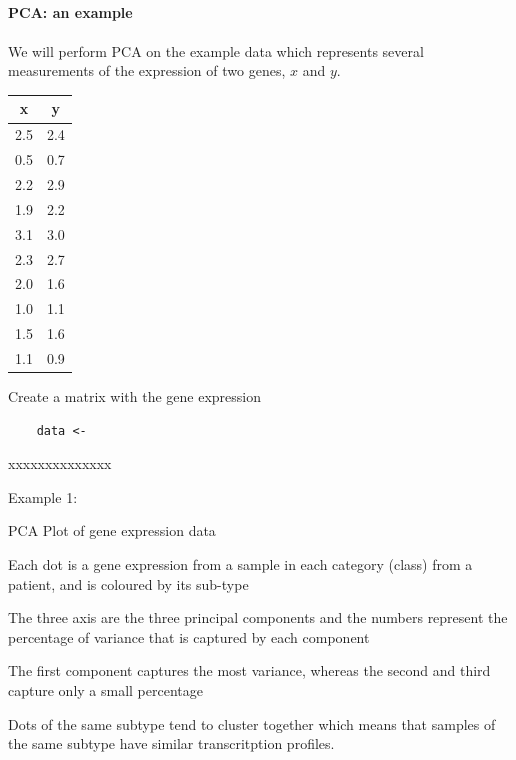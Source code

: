 \documentclass[11pt, oneside]{article}   	%
\begin{document}
\paragraph{PCA: an example}
\paragraph{}

We will perform PCA on the example data which represents several measurements of the expression of two genes, $x$ and $y$.

\begin{center}
\begin{tabular}{c|c}
   x & y \\
   \hline
   2.5 & 2.4\\
   0.5 & 0.7\\
   2.2 & 2.9\\
   1.9 & 2.2\\
   3.1 & 3.0\\
   2.3 & 2.7\\
   2.0 & 1.6\\
   1.0 & 1.1\\
   1.5 & 1.6\\
   1.1 & 0.9\\
   \hline
\end{tabular}
\end{center}


Create a matrix with the gene expression

\begin{framed}
\begin{verbatim}
	data <- 
\end{verbatim}
\end{framed}


xxxxxxxxxxxxxx




Example 1:

PCA Plot of gene expression data 

Each dot is a gene expression from a sample in each category (class) from a patient, and is coloured by its sub-type

The three axis are the three principal components 
and the numbers represent the percentage of variance that is captured by each component

The first component captures the most variance, whereas the second and third capture only a small percentage

Dots of the same subtype tend to cluster together which means that samples of the same subtype have similar transcritption profiles.
\end{document}

